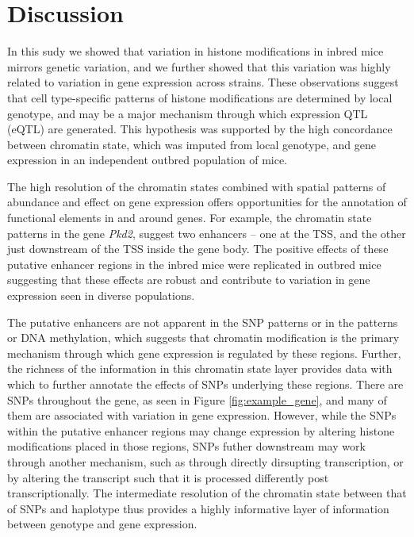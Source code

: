 \documentclass[10pt,letterpaper]{article}
\begin{document}
\hypertarget{discussion}{%
\section{Discussion}\label{discussion}}

In this sudy we showed that variation in histone modifications in inbred
mice mirrors genetic variation, and we further showed that this
variation was highly related to variation in gene expression across
strains. These observations suggest that cell type-specific patterns of
histone modifications are determined by local genotype, and may be a
major mechanism through which expression QTL (eQTL) are generated. This
hypothesis was supported by the high concordance between chromatin
state, which was imputed from local genotype, and gene expression in an
independent outbred population of mice.

The high resolution of the chromatin states combined with spatial
patterns of abundance and effect on gene expression offers opportunities
for the annotation of functional elements in and around genes. For
example, the chromatin state patterns in the gene \textit{Pkd2}, suggest
two enhancers -- one at the TSS, and the other just downstream of the
TSS inside the gene body. The positive effects of these putative
enhancer regions in the inbred mice were replicated in outbred mice
suggesting that these effects are robust and contribute to variation in
gene expression seen in diverse populations.

The putative enhancers are not apparent in the SNP patterns or in the
patterns or DNA methylation, which suggests that chromatin modification
is the primary mechanism through which gene expression is regulated by
these regions. Further, the richness of the information in this
chromatin state layer provides data with which to further annotate the
effects of SNPs underlying these regions. There are SNPs throughout the
gene, as seen in Figure \ref{fig:example_gene}, and many of them are
associated with variation in gene expression. However, while the SNPs
within the putative enhancer regions may change expression by altering
histone modifications placed in those regions, SNPs futher downstream
may work through another mechanism, such as through directly dirsupting
transcription, or by altering the transcript such that it is processed
differently post transcriptionally. The intermediate resolution of the
chromatin state between that of SNPs and haplotype thus provides a
highly informative layer of information between genotype and gene
expression.
\end{document}
